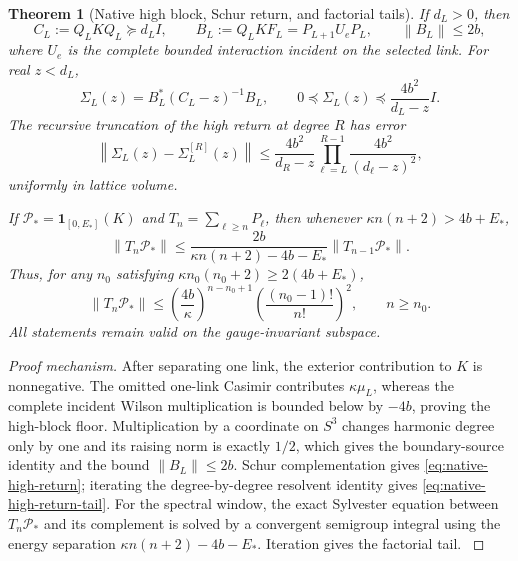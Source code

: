 \documentclass[11pt,oneside,openany]{book}
\newtheorem{theorem}{Theorem}[chapter]
\theoremstyle{definition}
\theoremstyle{remark}
\newcommand{\one}{\mathbf1}
\newcommand{\norm}[1]{\left\lVert#1\right\rVert}
\newcommand{\src}[2]{\cite[#2]{#1}}
\begin{document}
\begin{theorem}[Native high block, Schur return, and factorial tails]
\label{thm:native-high-Schur}
If $d_L>0$, then
\begin{equation}\label{eq:native-high-block}
 C_L:=Q_LKQ_L\succeq d_LI,
 \qquad B_L:=Q_LKF_L=P_{L+1}U_eP_L,
 \qquad \norm{B_L}\le2b,
\end{equation}
where $U_e$ is the complete bounded interaction incident on the selected
link.  For real $z<d_L$,
\begin{equation}\label{eq:native-high-return}
 \Sigma_L(z)=B_L^*(C_L-z)^{-1}B_L,
 \qquad
 0\preceq\Sigma_L(z)\preceq\frac{4b^2}{d_L-z}I.
\end{equation}
The recursive truncation of the high return at degree $R$ has error
\begin{equation}\label{eq:native-high-return-tail}
 \norm{\Sigma_L(z)-\Sigma_L^{[R]}(z)}
 \le \frac{4b^2}{d_R-z}
       \prod_{\ell=L}^{R-1}
          \frac{4b^2}{(d_\ell-z)^2},
\end{equation}
uniformly in lattice volume.

If $\mathcal P_*=\one_{[0,E_*]}(K)$ and
$T_n=\sum_{\ell\ge n}P_\ell$, then whenever
$\kappa n(n+2)>4b+E_*$,
\begin{equation}\label{eq:native-spectral-window-tail}
 \norm{T_n\mathcal P_*}
 \le \frac{2b}{\kappa n(n+2)-4b-E_*}
       \norm{T_{n-1}\mathcal P_*}.
\end{equation}
Thus, for any $n_0$ satisfying
$\kappa n_0(n_0+2)\ge2(4b+E_*)$,
\begin{equation}\label{eq:native-spectral-window-factorial}
 \norm{T_n\mathcal P_*}
 \le\left(\frac{4b}{\kappa}\right)^{n-n_0+1}
       \left(\frac{(n_0-1)!}{n!}\right)^2,
 \qquad n\ge n_0.
\end{equation}
All statements remain valid on the gauge-invariant subspace.
\end{theorem}
\begin{proof}[Proof mechanism]
After separating one link, the exterior contribution to $K$ is
nonnegative.  The omitted one-link Casimir contributes
$\kappa\mu_L$, whereas the complete incident Wilson multiplication is
bounded below by $-4b$, proving the high-block floor.  Multiplication by
a coordinate on $S^3$ changes harmonic degree only by one and its
raising norm is exactly $1/2$, which gives the boundary-source identity
and the bound $\norm{B_L}\le2b$.  Schur complementation gives
\cref{eq:native-high-return}; iterating the degree-by-degree resolvent
identity gives \cref{eq:native-high-return-tail}.  For the spectral
window, the exact Sylvester equation between $T_n\mathcal P_*$ and its
complement is solved by a convergent semigroup integral using the
energy separation $\kappa n(n+2)-4b-E_*$.  Iteration gives the
factorial tail.  \src{F17}{V99}
\end{proof}
\end{document}
